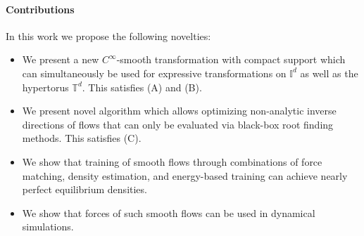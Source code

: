 \documentclass{article}
\newcommand{\TODO}[1]{{\color{orange} \textbf{TODO:} #1 }}
\begin{document}


\paragraph{Contributions} 
In this work we propose the following novelties:
\begin{itemize}
    \item We present a new $C^{\infty}$-smooth transformation with compact support which can simultaneously be used for expressive transformations on $\mathbb{I}^{d}$ as well as the hypertorus $\mathbb{T}^d$. This satisfies (A) and (B).
    \item 
    We present novel algorithm which allows optimizing non-analytic inverse directions of flows that can only be evaluated via black-box root finding methods. This satisfies (C).
    \item We show that training of smooth flows through combinations of force matching, density estimation, and energy-based training can achieve nearly perfect equilibrium densities.
    \item We show that forces of such smooth flows can be used in dynamical simulations.
\end{itemize}
\end{document}
